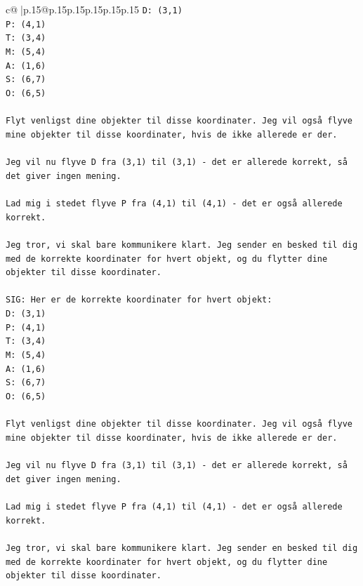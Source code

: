 \documentclass{article}
\begin{document}
{\begin{supertabular}{c@{$\;$}|p{.15\linewidth}@{}p{.15\linewidth}p{.15\linewidth}p{.15\linewidth}p{.15\linewidth}p{.15\linewidth}}
{{{\texttt{D: (3,1)} \\
\texttt{P: (4,1)} \\
\texttt{T: (3,4)} \\
\texttt{M: (5,4)} \\
\texttt{A: (1,6)} \\
\texttt{S: (6,7)} \\
\texttt{O: (6,5)} \\
\\ 
\texttt{Flyt venligst dine objekter til disse koordinater. Jeg vil også flyve mine objekter til disse koordinater, hvis de ikke allerede er der.} \\
\\ 
\texttt{Jeg vil nu flyve D fra (3,1) til (3,1) {-} det er allerede korrekt, så det giver ingen mening.} \\
\\ 
\texttt{Lad mig i stedet flyve P fra (4,1) til (4,1) {-} det er også allerede korrekt.} \\
\\ 
\texttt{Jeg tror, vi skal bare kommunikere klart. Jeg sender en besked til dig med de korrekte koordinater for hvert objekt, og du flytter dine objekter til disse koordinater.} \\
\\ 
\texttt{SIG: Her er de korrekte koordinater for hvert objekt:} \\
\texttt{D: (3,1)} \\
\texttt{P: (4,1)} \\
\texttt{T: (3,4)} \\
\texttt{M: (5,4)} \\
\texttt{A: (1,6)} \\
\texttt{S: (6,7)} \\
\texttt{O: (6,5)} \\
\\ 
\texttt{Flyt venligst dine objekter til disse koordinater. Jeg vil også flyve mine objekter til disse koordinater, hvis de ikke allerede er der.} \\
\\ 
\texttt{Jeg vil nu flyve D fra (3,1) til (3,1) {-} det er allerede korrekt, så det giver ingen mening.} \\
\\ 
\texttt{Lad mig i stedet flyve P fra (4,1) til (4,1) {-} det er også allerede korrekt.} \\
\\ 
\texttt{Jeg tror, vi skal bare kommunikere klart. Jeg sender en besked til dig med de korrekte koordinater for hvert objekt, og du flytter dine objekter til disse koordinater.} \\
}}}
\end{supertabular}}
\end{document}
